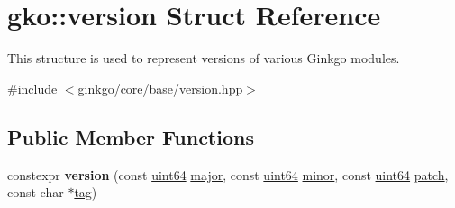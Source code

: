 \hypertarget{structgko_1_1version}{}\section{gko\+:\+:version Struct Reference}
\label{structgko_1_1version}


This structure is used to represent versions of various Ginkgo modules.  




{\ttfamily \#include $<$ginkgo/core/base/version.\+hpp$>$}

\subsection*{Public Member Functions}
\begin{DoxyCompactItemize}
\item 
\mbox{\label{structgko_1_1version_a1e7f6c401dfc69568dd4d46256e9468b}} 
constexpr {\bfseries version} (const \hyperlink{namespacegko_ad54a79afecd57aabbb04b1dc611ae55e}{uint64} \hyperlink{structgko_1_1version_a019ce1d31714612e0c77c8ef5eb4cfde}{major}, const \hyperlink{namespacegko_ad54a79afecd57aabbb04b1dc611ae55e}{uint64} \hyperlink{structgko_1_1version_abb548e6dca39e0a3718ecf13cafbba36}{minor}, const \hyperlink{namespacegko_ad54a79afecd57aabbb04b1dc611ae55e}{uint64} \hyperlink{structgko_1_1version_a7580f68f7cf0600bc620c47ed6330c95}{patch}, const char $\ast$\hyperlink{structgko_1_1version_a1bd0eaa4d551c145ff9cd0c10e555ac3}{tag})
\end{DoxyCompactItemize}
